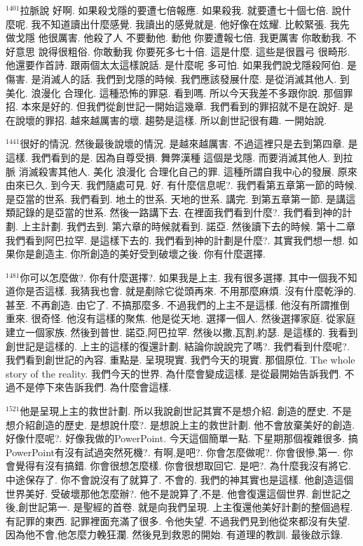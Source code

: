 \documentclass{book}
\begin{document}
$^{1401}$拉脈說 好啊.
如果殺戈隱的要遭七倍報應.
如果殺我.
就要遭七十個七倍.
說什麼呢.
我不知道讀出什麼感覺.
我讀出的感覺就是.
他好像在炫耀.
比較緊張.
我先做戈隱 他很厲害.
他殺了人 不要動他.
動他 你要遭報七倍.
我更厲害 你敢動我.
不好意思 說得很粗俗.
你敢動我 你要死多七十倍.
這是什麼.
這些是很囂弓 很畸形.
他還要作首詩.
跟兩個太太這樣說話.
是什麼呢 多可怕.
如果我們說戈隱殺阿伯.
是傷害.
是消滅人的話.
我們到戈隱的時候.
我們應該發展什麼.
是從消滅其他人.
到美化.
浪漫化 合理化.
這種恐怖的罪惡.
看到嗎.
所以今天我差不多跟你說.
那個罪招.
本來是好的.
但我們從創世記一開始這幾章.
我們看到的罪招就不是在說好.
是在說壞的罪招.
越來越厲害的壞.
趨勢是這樣.
所以創世記很有趣.
一開始說.

$^{1441}$很好的情況.
然後最後說壞的情況.
是越來越厲害.
不過這裡只是去到第四章.
是這樣.
我們看到的是.
因為自尊受損.
舞弊漢種 這個是戈隱.
而要消滅其他人.
到拉脈 消滅殺害其他人.
美化 浪漫化 合理化自己的罪.
這種所謂自我中心的發展.
原來由來已久.
到今天.
我們隨處可見.
好.
有什麼信息呢?.
我們看第五章第一節的時候.
是亞當的世系.
我們看到.
地土的世系.
天地的世系.
講完.
到第五章第一節.
是講這類記錄的是亞當的世系.
然後一路講下去.
在裡面我們看到什麼?.
我們看到神的計劃.
上主計劃.
我們去到.
第六章的時候就看到.
諾亞.
然後讀下去的時候.
第十二章我們看到阿巴拉罕.
是這樣下去的.
我們看到神的計劃是什麼?.
其實我們想一想.
如果你是創造主.
你所創造的美好受到破壞之後.
你有什麼選擇.

$^{1481}$你可以怎麼做?.
你有什麼選擇?.
如果我是上主.
我有很多選擇.
其中一個我不知道你是否這樣.
我猜我也會.
就是剷除它從頭再來.
不用那麼麻煩.
沒有什麼乾淨的.
甚至.
不再創造.
由它了.
不搞那麼多.
不過我們的上主不是這樣.
他沒有所謂推倒重來.
很奇怪.
他沒有這樣的聚焦.
他是從天地.
選擇一個人.
然後選擇家庭.
從家庭建立一個家族.
然後到普世.
諾亞,阿巴拉罕.
然後以撒,瓦割,約瑟.
是這樣的.
我看到創世記是這樣的.
上主的這樣的復還計劃.
結論你說說完了嗎?.
我們看到什麼呢?.
我們看到創世記的內容.
重點是.
呈現現實.
我們今天的現實.
那個原位.
The whole story of the reality.
我們今天的世界.
為什麼會變成這樣.
是從最開始告訴我們.
不過不是停下來告訴我們.
為什麼會這樣.

$^{1521}$他是呈現上主的救世計劃.
所以我說創世記其實不是想介紹.
創造的歷史.
不是想介紹創造的歷史.
是想說什麼?.
是想說上主的救世計劃.
他不會放棄美好的創造.
好像什麼呢?.
好像我做的PowerPoint.
今天這個簡單一點.
下星期那個複雜很多.
搞PowerPoint有沒有試過突然死機?.
有啊,是吧?.
你會怎麼做呢?.
你會很慘,第一.
你會覺得有沒有搞錯.
你會很想怎麼樣.
你會很想取回它.
是吧?.
為什麼我沒有將它.
中途保存了.
你不會說沒有了就算了.
不會的.
我們的神其實也是這樣.
他創造這個世界美好.
受破壞那他怎麼辦?.
他不是說算了,不是.
他會復還這個世界.
創世記之後,創世記第一.
是聖經的首卷.
就是向我們呈現.
上主復還他美好計劃的整個過程.
有記罪的東西.
記罪裡面充滿了很多.
令他失望.
不過我們見到他從來都沒有失望.
因為他不會,他怎麼力輓狂瀾.
然後見到救恩的開始.
有道理的教訓.
最後啟示錄.
\end{document}
